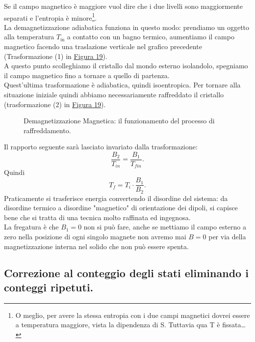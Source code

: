 \noindent
Se il campo magnetico è maggiore vuol dire che i due livelli sono maggiormente separati e l'entropia è minore\footnote{O meglio, per avere la stessa entropia con i due campi magnetici dovrei essere a temperatura maggiore, vista la dipendenza di S. Tuttavia qua T è fissata\ldots}.\\
La demagnetizzazione adiabatica funziona in questo modo: prendiamo un oggetto alla temperatura $T_{\text{in}}$ a contatto con un bagno termico, aumentiamo il campo magnetico facendo una traslazione verticale nel grafico precedente (Trasformazione (1) in \hyperref[fig:demagnetizzazione-adiabatica-1]{Figura 19}).\\
A questo punto scolleghiamo il cristallo dal mondo esterno isolandolo, spegniamo il campo magnetico fino a tornare a quello di partenza. \\
Quest'ultima trasformazione è adiabatica, quindi isoentropica. Per tornare alla situazione iniziale quindi abbiamo necessariamente raffreddato il cristallo (trasformazione (2) in \hyperref[fig:demagnetizzazione-adiabatica-1]{Figura 19}).
\begin{figure}[H]
    \centering
    \caption{Demagnetizzazione Magnetica: il funzionamento del processo di raffreddamento.}
    \label{fig:demagnetizzazione-adiabatica-1}
\end{figure}
\noindent
Il rapporto seguente sarà lasciato invariato dalla trasformazione:
\[
	\frac{B_2}{T_{in}} = \frac{B_1}{T_{fin}}
.\] 
Quindi 
\[
	T_{f} = T_{i}\cdot \frac{B_1}{B_2}
.\] 
Praticamente si trasferisce energia convertendo il disordine del sistema: da disordine termico a disordine "magnetico" di orientazione dei dipoli, si capisce bene che si tratta di una tecnica molto raffinata ed ingegnosa.\\
La fregatura è che $B_1=0$ non si può fare, anche se mettiamo il campo esterno a zero nella posizione di ogni singolo magnete non avremo mai $B = 0$ per via della magnetizzazione interna nel solido che non può essere spenta.\\
\subsection{Correzione al conteggio degli stati eliminando i conteggi ripetuti.}%
